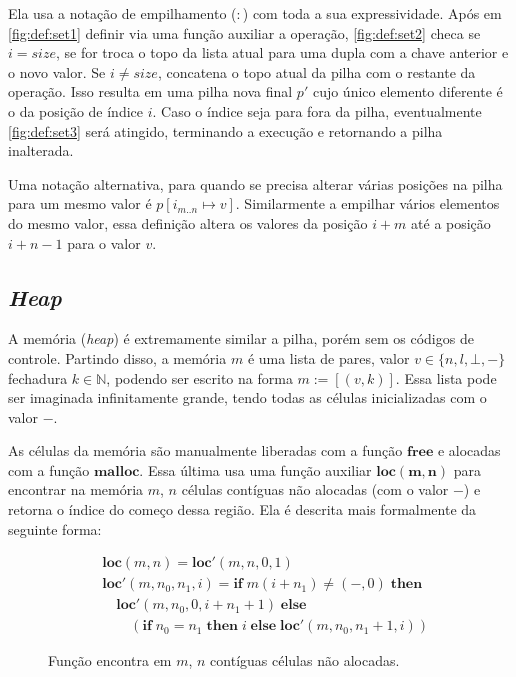 Ela usa a notação de empilhamento ($:$) com toda a sua expressividade. Após em \ref{fig:def:set1} definir via uma função auxiliar a operação, \ref{fig:def:set2} checa se $i = size$, se for troca o topo da lista atual para uma dupla com a chave anterior e o novo valor. Se $i \neq size$, concatena o topo atual da pilha com o restante da operação. Isso resulta em uma pilha nova final $p'$ cujo único elemento diferente é o da posição de índice $i$. Caso o índice seja para fora da pilha, eventualmente \ref{fig:def:set3} será atingido, terminando a execução e retornando a pilha inalterada.

Uma notação alternativa, para quando se precisa alterar várias posições na pilha para um mesmo valor é $p[i_{m..n} \mapsto v]$. Similarmente a empilhar vários elementos do mesmo valor, essa definição altera os valores da posição $i + m$ até a posição $i + n - 1$ para o valor $v$.


\subsection{\emph{Heap}}
\label{sec:pcl-back:mem}

A memória (\emph{heap}) é extremamente similar a pilha, porém sem os códigos de controle. Partindo disso, a memória $m$ é uma lista de pares, valor $v \in \{n, l, \bot, -\}$ fechadura $k \in \mathbb{N}$, podendo ser escrito na forma $m := [(v, k)]$. Essa lista pode ser imaginada infinitamente grande, tendo todas as células inicializadas com o valor $-$.

As células da memória são manualmente liberadas com a função $\mathbf{free}$ e alocadas com a função $\mathbf{malloc}$. Essa última usa uma função auxiliar $\mathbf{loc(m,n)}$ para encontrar na memória $m$, $n$ células contíguas não alocadas (com o valor $-$) e retorna o índice do começo dessa região. Ela é descrita mais formalmente da seguinte forma:

\begin{figure}[ht]
	\begin{align}
	&\mathbf{loc}(m,n) = \mathbf{loc}'(m, n, 0, 1) \label{fig:def:loc1}\\
	& \mathbf{loc}'(m, n_0 , n_1, i) = \mathbf{if}\; m(i + n_1) \neq (-,0) \; \mathbf{then}\nonumber \\
	&\quad\mathbf{loc}'(m, n_0, 0, i + n_1 + 1)\; \mathbf{else} \nonumber\\
	&\quad\quad(\mathbf{if}\; n_0 = n_1 \; \mathbf{then}\; i \;\mathbf{else}\; \mathbf{loc}'(m, n_0, n_1 + 1, i)) \label{fig:def:loc2}
	\end{align}
	\caption{Função encontra em $m$, $n$ contíguas células não alocadas.}
	\label{fig:def:loc}
\end{figure}

